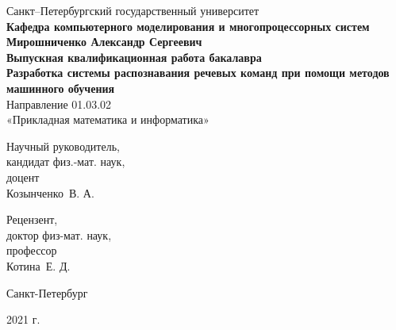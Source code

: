 \begin{titlepage}
\begin{center}
Санкт--Петербургский государственный университет \\
\textbf{Кафедра компьютерного моделирования и многопроцессорных систем}
\vspace{47mm} \\
\textbf{\large Мирошниченко Александр Сергеевич} \\[10mm]
\textbf{\large Выпускная квалификационная работа бакалавра} \\[10mm]
\textbf{\large Разработка системы распознавания речевых команд при помощи методов машинного обучения} \\
Направление 01.03.02 \\
«Прикладная математика и информатика»\\[20mm]
\begin{flushright}
Научный руководитель, \\
кандидат физ.-мат. наук, \\доцент \\Козынченко~В. А.\\
\end{flushright}
\begin{flushright}
Рецензент, \\
доктор физ-мат. наук, \\профессор  \\Котина~Е. Д.
\end{flushright}
\vfill 
{Санкт-Петербург}
\par{2021 г.}
\end{center}
\end{titlepage}
\addtocounter{page}{1}